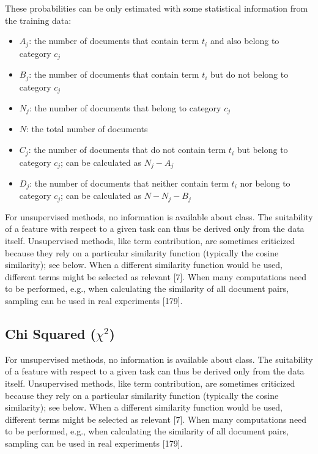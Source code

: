 \documentclass[11pt,openany,executivepaper]{book}
\begin{document}
These probabilities can be only estimated with some statistical information from the training data:

\begin{itemize}
    \item $A_j$: the number of documents that contain term $t_i$ and also belong to category $c_j$
    \item $B_j$: the number of documents that contain term $t_i$ but do not belong to category $c_j$
    \item $N_j$: the number of documents that belong to category $c_j$
    \item $N$: the total number of documents
    \item $C_j$: the number of documents that do not contain term $t_i$ but belong to category $c_j$; can be calculated as $N_j - A_j$
    \item $D_j$: the number of documents that neither contain term $t_i$ nor belong to category $c_j$; can be calculated as $N - N_j - B_j$
\end{itemize}

For unsupervised methods, no information is available about class. The suitability of a feature with respect to a given task can thus be derived only from the data itself. Unsupervised methods, like term contribution, are sometimes criticized because they rely on a particular similarity function (typically the cosine similarity); see below. When a different similarity function would be used, different terms might be selected as relevant [7]. When many computations need to be performed, e.g., when calculating the similarity of all document pairs, sampling can be used in real experiments [179].

\subsection{Chi Squared (\texorpdfstring{$\chi^2$}{Chi Squared})}

For unsupervised methods, no information is available about class. The suitability of a feature with respect to a given task can thus be derived only from the data itself. Unsupervised methods, like term contribution, are sometimes criticized because they rely on a particular similarity function (typically the cosine similarity); see below. When a different similarity function would be used, different terms might be selected as relevant [7]. When many computations need to be performed, e.g., when calculating the similarity of all document pairs, sampling can be used in real experiments [179].
\end{document}
